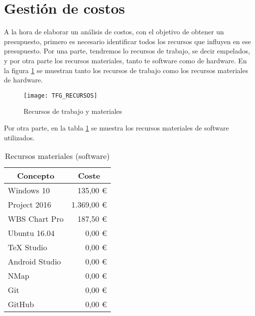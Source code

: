 

\section{Gestión de costos}
A la hora de elaborar un análisis de costos, con el objetivo de obtener un presupuesto, primero es necesario identificar todos los recursos que influyen en ese presupuesto. Por una parte, tendremos lo recursos de trabajo, se decir empelados, y por otra parte los recursos materiales, tanto te software como de hardware. En la figura \ref{fig:recursos} se muestran tanto los recursos de trabajo como los recursos materiales de hardware.

\begin{figure}[H]
	\centering
	\texttt{[image: TFG\_RECURSOS]}
	\caption{Recursos de trabajo y materiales}
	\label{fig:recursos}
\end{figure}

Por otra parte, en la tabla \ref{table:software} se muestra los recursos materiales de software utilizados.

\begin{table}[H]
	\centering
	\begin{tabular}{ |l|r| } 
		\hline
		\multicolumn{1}{|c|}{Concepto} & 
			\multicolumn{1}{|c|}{Coste} \\
		\hline
		Windows 10 		& 135,00 \euro \cite{precio-win10}		\\
		Project 2016 	& 1.369,00 \euro \cite{precio-project}	\\
		WBS Chart Pro 	& 187,50 \euro \cite{precio-wbs}		\\
		Ubuntu 16.04 	& 0,00 \euro							\\
		TeX Studio 		& 0,00 \euro							\\
		Android Studio 	& 0,00 \euro							\\
		NMap 			& 0,00 \euro							\\
		Git 			& 0,00 \euro							\\
		GitHub 			& 0,00 \euro							\\
		\hline
	\end{tabular}
	\caption{Recursos materiales (software)}
	\label{table:software}
\end{table}


